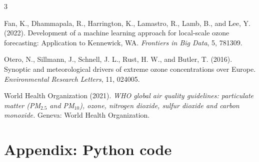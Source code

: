 \documentclass[10pt,a4paper]{article}
\begin{document}
\begin{thebibliography}{3}

Fan, K., Dhammapala, R., Harrington, K., Lamastro, R., Lamb, B., and Lee, Y. (2022).
Development of a machine learning approach for local-scale ozone forecasting:
Application to Kennewick, WA.
\textit{Frontiers in Big Data}, 5, 781309.

Otero, N., Sillmann, J., Schnell, J. L., Rust, H. W., and Butler, T. (2016).
Synoptic and meteorological drivers of extreme ozone concentrations over Europe.
\textit{Environmental Research Letters}, 11, 024005.

World Health Organization (2021).
\textit{WHO global air quality guidelines: particulate matter (PM$_{2.5}$ and PM$_{10}$), ozone, nitrogen dioxide, sulfur dioxide and carbon monoxide.}
Geneva: World Health Organization.

\end{thebibliography}
\label{abstractend}   %

\clearpage
\section*{Appendix: Python code}

\end{document}
